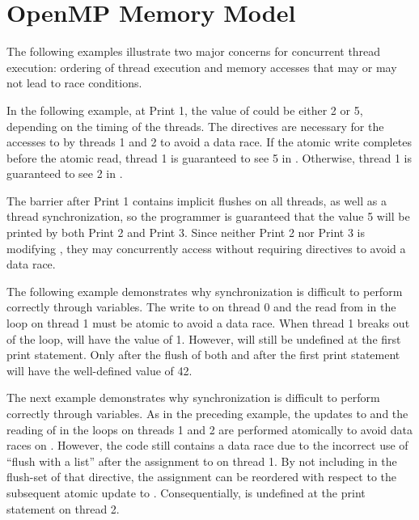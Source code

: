 
\section{OpenMP Memory Model}
\label{sec:mem_model}

The following examples illustrate two major concerns for concurrent thread
execution: ordering of thread execution and memory accesses that may or may not
lead to race conditions.

In the following example, at Print 1, the value of  could be either 2
or 5, depending on the timing of the threads. The  directives are
necessary for the accesses to  by threads 1 and 2 to avoid a data race.
If the atomic write completes before the atomic read, thread 1 is guaranteed to
see 5 in . Otherwise, thread 1 is guaranteed to see 2 in .

The barrier after Print 1 contains implicit flushes on all threads, as well as
a thread synchronization, so the programmer is guaranteed that the value 5 will
be printed by both Print 2 and Print 3. Since neither Print 2 nor Print 3 is modifying
, they may concurrently access  without requiring 
directives to avoid a data race.



\pagebreak
{}
The following example demonstrates why synchronization is difficult to perform
correctly through variables. The write to  on thread 0 and the read
from  in the loop on thread 1 must be atomic to avoid a data race.
When thread 1 breaks out of the loop,  will have the value of 1.
However,  will still be undefined at the first print statement. Only
after the flush of both  and  after the first print
statement will  have the well-defined value of 42.



\pagebreak
{}
The next example demonstrates why synchronization is difficult to perform
correctly through variables. As in the preceding example, the updates to
 and the reading of  in the loops on threads 1 and 2 are
performed atomically to avoid data races on . However, the code still
contains a data race due to the incorrect use of ``flush with a list'' after the
assignment to  on thread 1. By not including  in the
flush-set of that  directive, the assignment can be reordered with
respect to the subsequent atomic update to . Consequentially,
 is undefined at the print statement on thread 2.

